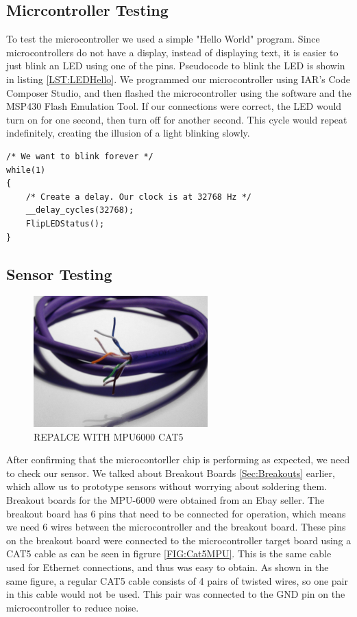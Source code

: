 \subsection{Micrcontroller Testing}
To test the microcontroller we used a simple "Hello World" program.
Since microcontrollers do not have a display, instead of displaying text,
it is easier to just blink an LED using one of the pins.
Pseudocode to blink the LED is showin in listing \ref{LST:LEDHello}.
We programmed our microcontroller using IAR's Code Composer Studio,
and then flashed the microcontroller using the software and the MSP430 Flash Emulation Tool.
If our connections were correct,
the LED would turn on for one second,
then turn off for another second.
This cycle would repeat indefinitely, creating the illusion of a light blinking slowly.
\begin{lstlisting}[caption=My caption,label=LST:LEDHello]
/* We want to blink forever */
while(1)
{
	/* Create a delay. Our clock is at 32768 Hz */
	__delay_cycles(32768);
	FlipLEDStatus();  
}
\end{lstlisting}
\subsection{Sensor Testing}
\label{Sec:SensorTesting}
\begin{figure}
\begin{center}
\includegraphics[width=0.6\textwidth]{images/Cat5Twist.jpg}
\caption{REPALCE WITH MPU6000 CAT5}
\label{Fig:CAt5MPU}
\end{center}
\end{figure}

After confirming that the microcontorller chip is performing as expected,
we need to check our sensor. We talked about Breakout Boards \ref{Sec:Breakouts} earlier,
which allow us to prototype sensors without worrying about soldering them.
Breakout boards for the MPU-6000 were obtained from an Ebay seller.
The breakout board has 6 pins that need to be connected for operation,
which means we need 6 wires between the microcontroller and the breakout board.
These pins on the breakout board were connected to the microcontroller target board using a CAT5 cable as can be seen in figrure \ref{FIG:Cat5MPU}.
This is the same cable used for Ethernet connections, and thus was easy to obtain.
As shown in the same figure,
a regular CAT5 cable consists of 4 pairs of twisted wires,
so one pair in this cable would not be used.
This pair was connected to the GND pin on the microcontroller to reduce noise.

